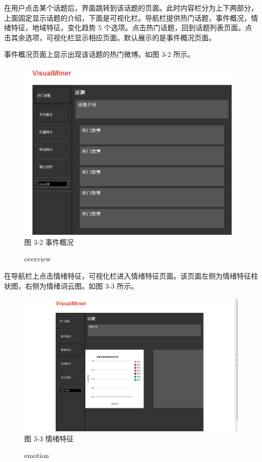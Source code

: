 在用户点击某个话题后，界面跳转到该话题的页面。此时内容栏分为上下两部分，上面固定显示话题的介绍，下面是可视化栏。导航栏提供热门话题，事件概况，情绪特征，地域特征，变化趋势 5 个选项。点击热门话题，回到话题列表页面。点击其余选项，可视化栏显示相应页面。默认展示的是事件概况页面。

事件概况页面上显示出现该话题的热门微博。如图 3-2 所示。

\begin{figure}[t]
\centering
\includegraphics[width=\textwidth, height=0.37\textheight]{web_topic}
图 3-2 事件概况
\caption{overview}
\end{figure}

在导航栏上点击情绪特征，可视化栏进入情绪特征页面。该页面左侧为情绪特征柱状图，右侧为情绪词云图。如图 3-3 所示。
\begin{figure}[!h]
\centering
\includegraphics[width=\textwidth, height=0.37\textheight]{web_emotion}
图 3-3 情绪特征
\caption{emotion}
\end{figure}

